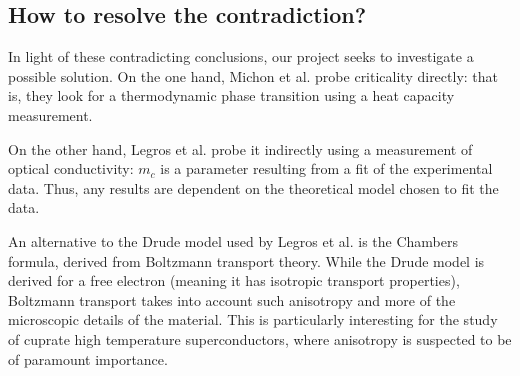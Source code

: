 \subsection{How to resolve the contradiction?}
In light of these contradicting conclusions, our project seeks to investigate a possible solution.
On the one hand, Michon et al. probe criticality directly: 
that is, they look for a thermodynamic phase transition using a heat capacity measurement.

On the other hand, Legros et al. probe it indirectly using a measurement of optical conductivity: 
$m_c$ is a parameter resulting from a fit of the experimental data. 
Thus, any results are dependent on the theoretical model chosen to fit the data.

An alternative to the Drude model used by Legros et al. is the Chambers formula, 
derived from Boltzmann transport theory.  While the Drude model is derived for a
free electron (meaning it has isotropic transport properties), 
Boltzmann transport takes into account such anisotropy and more of the microscopic details of the
material.  This is particularly interesting for the study of cuprate high temperature
superconductors, where anisotropy is suspected to be of paramount importance.


